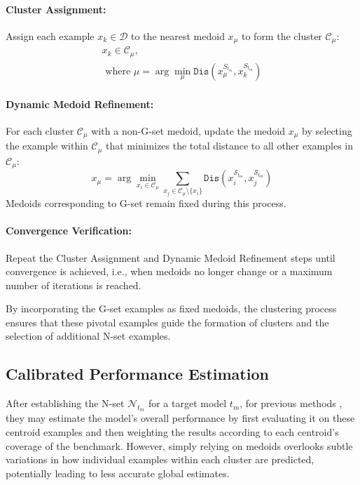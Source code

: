 \paragraph{Cluster Assignment:} Assign each example $x_k \in \mathcal{D}$ to the nearest medoid $x_{\mu}$ to form the cluster $\mathcal{C}_{\mu}$:
\begin{equation}
    \begin{gathered}
    x_k \in \mathcal{C}_{\mu},\\ \text{ where } \mu=\arg\min_{\mu} \texttt{Dis} \left( x_{\mu}^{S_{t_m}}, x_k^{S_{t_m}}\right)
    \end{gathered}
\end{equation}
\paragraph{Dynamic Medoid Refinement:} For each cluster $\mathcal{C}_{\mu}$ with a non-G-set medoid, update the medoid $x_{\mu}$ by selecting the example within $\mathcal{C}_{\mu}$ that minimizes the total distance to all other examples in $\mathcal{C}_{\mu}$:
\begin{equation}x_{\mu}=\arg\min_{x_i\in\mathcal{C}_{\mu}}\sum_{x_j\in{\mathcal{C}_{\mu}}\setminus{\{x_i\}}}\texttt{Dis}\left(x_i^{\mathcal{S}_{t_m}}, x_j^{\mathcal{S}_{t_m}}\right)
\end{equation}
Medoids corresponding to G-set remain fixed during this process.

\paragraph{Convergence Verification:} Repeat the Cluster Assignment and Dynamic Medoid Refinement steps until convergence is achieved, i.e., when medoids no longer change or a maximum number of iterations is reached.

By incorporating the G-set examples as fixed medoids, the clustering process ensures that these pivotal examples guide the formation of clusters and the selection of additional N-set examples.

\subsection{Calibrated Performance Estimation}
\label{sec:EsmPerform}
After establishing the N-set $\mathcal{N}_{t_m}$ for a target model $t_{m}$, for previous methods \cite{AP,tiny}, they may estimate the model’s overall performance by first evaluating it on these centroid examples and then weighting the results according to each centroid’s coverage of the benchmark. However, simply relying on medoids overlooks subtle variations in how individual examples within each cluster are predicted, potentially leading to less accurate global estimates.

